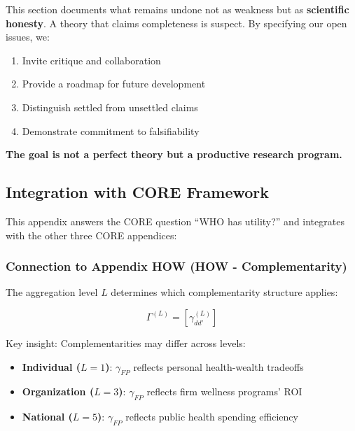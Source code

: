 \begin{tcolorbox}[colback=blue!5!white, colframe=blue!75!black, title=Commitment to Scientific Integrity]
This section documents what remains undone not as weakness but as \textbf{scientific 
honesty}. A theory that claims completeness is suspect. By specifying our open 
issues, we:
\begin{enumerate}[nosep]
\item Invite critique and collaboration
\item Provide a roadmap for future development
\item Distinguish settled from unsettled claims
\item Demonstrate commitment to falsifiability
\end{enumerate}

\textbf{The goal is not a perfect theory but a productive research program.}
\end{tcolorbox}




\subsection{Integration with CORE Framework}
\label{sec:AAA-core-integration}

This appendix answers the CORE question ``WHO has utility?'' and integrates 
with the other three CORE appendices:

\subsubsection{Connection to Appendix HOW (HOW - Complementarity)}

The aggregation level $L$ determines which complementarity structure applies:

\begin{equation}
\Gamma^{(L)} = [\gamma_{dd'}^{(L)}]
\end{equation}

Key insight: Complementarities may differ across levels:
\begin{itemize}
    \item \textbf{Individual ($L=1$)}: $\gamma_{FP}$ reflects personal health-wealth tradeoffs
    \item \textbf{Organization ($L=3$)}: $\gamma_{FP}$ reflects firm wellness programs' ROI
    \item \textbf{National ($L=5$)}: $\gamma_{FP}$ reflects public health spending efficiency
\end{itemize}

